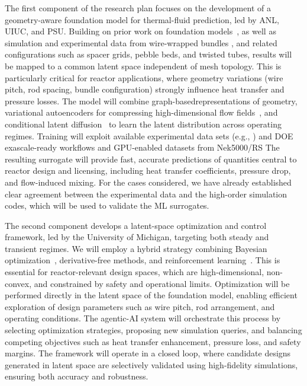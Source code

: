 The first component of the research plan focuses on the development of a
geometry-aware foundation model for thermal-fluid prediction, led by ANL,
UIUC, and PSU.
Building on prior work on foundation models~\cite{Vishwasrao2026AgenticPDE}, as
well as simulation and experimental data from wire-wrapped bundles
\cite{Dai2025WireWrapped61Pin,kaeri37pin}, and related configurations such as
spacer grids, pebble beds, and twisted tubes, results will be mapped to a
common latent space independent of mesh topology.
%
This is particularly critical for reactor applications, where geometry
variations (wire pitch, rod spacing, bundle configuration) strongly influence
heat transfer and pressure losses.
  The model will combine graph-basedrepresentations of geometry, variational
autoencoders for compressing high-dimensional flow
fields~\cite{Vinuesa2022MLCFD,SoleraRico2024BetaVAE}, and conditional latent
diffusion~\cite{Vishwasrao2025DiffSPORT} to learn the latent distribution
across operating regimes.
%
Training will exploit available experimental data sets (e.g.,
\cite{kaeri37pin}) and DOE exascale-ready workflows and GPU-enabled
datasets from Nek5000/RS The resulting surrogate will provide fast, accurate
predictions of quantities central to reactor design and licensing, including
heat transfer coefficients, pressure drop, and flow-induced mixing.
   For the cases considered, we have already established clear agreement
between the experimental data and the high-order simulation codes, which
will be used to validate the ML surrogates.

The second component develops a latent-space optimization and control
framework, led by the University of Michigan, targeting both steady and
transient regimes. We will employ a hybrid strategy combining Bayesian
optimization~\cite{Morita2022BOCFD}, derivative-free methods, and reinforcement
learning~\cite{Font2025DRLFlowControl}. This is essential for reactor-relevant
design spaces, which are high-dimensional, non-convex, and constrained by
safety and operational limits. Optimization will be performed directly in the
latent space of the foundation model, enabling efficient exploration of design
parameters such as wire pitch, rod arrangement, and operating conditions. The
agentic-AI system will orchestrate this process by selecting optimization
strategies, proposing new simulation queries, and balancing competing
objectives such as heat transfer enhancement, pressure loss, and safety
margins. The framework will operate in a closed loop, where candidate designs
generated in latent space are selectively validated using high-fidelity
simulations, ensuring both accuracy and robustness.

